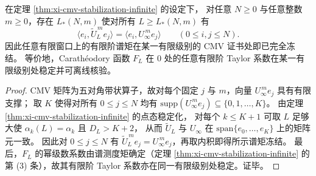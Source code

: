 
\begin{conclusion}\label{con:xi-cmv-finite-window-freeze}
在定理 \ref{thm:xi-cmv-stabilization-infinite} 的设定下，
对任意 \(N\ge 0\) 与任意整数 \(m\ge 0\)，存在 \(L_\ast(N,m)\) 使对所有 \(L\ge L_\ast(N,m)\) 有
\[
\langle e_i,\widetilde U_L^{\,m}e_j\rangle=\langle e_i,U_\infty^{\,m}e_j\rangle
\qquad(0\le i,j\le N).
\]
因此任意有限窗口上的有限阶谱矩在某一有限级别的 CMV 证书处即已完全冻结。
等价地，Carath\'eodory 函数 \(F_L\) 在 \(0\) 处的任意有限阶 Taylor 系数在某一有限级别处稳定并可离线核验。
\end{conclusion}
\begin{proof}
CMV 矩阵为五对角带状算子，故对每个固定 \(j\) 与 \(m\)，向量 \(U_\infty^{\,m}e_j\) 具有有限支撑；
取 \(K\) 使得对所有 \(0\le j\le N\) 均有 \(\mathrm{supp}(U_\infty^{\,m}e_j)\subseteq\{0,1,\dots,K\}\)。
由定理 \ref{thm:xi-cmv-stabilization-infinite} 的点态稳定化，
对每个 \(k\le K+1\) 可取 \(L\) 足够大使 \(\alpha_k(L)=\alpha_k\) 且 \(D_L>K+2\)，
从而 \(\widetilde U_L\) 与 \(U_\infty\) 在 \(\mathrm{span}\{e_0,\dots,e_K\}\) 上的矩阵元一致。
因此对 \(0\le j\le N\) 有 \(\widetilde U_L^{\,m}e_j=U_\infty^{\,m}e_j\)，再取内积即得所示谱矩冻结。
最后，\(F_L\) 的幂级数系数由谱测度矩确定（定理 \ref{thm:xi-cmv-stabilization-infinite} 的第 (3) 条），故其有限阶 Taylor 系数亦在同一有限级别处稳定。证毕。
\end{proof}

\endinput
